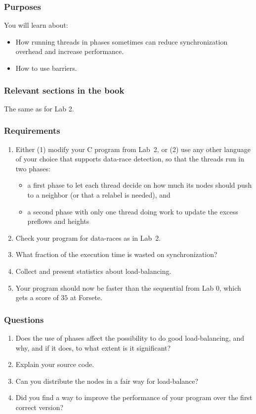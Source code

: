 \documentclass{forsete}
\begin{document}
\subsubsection*{Purposes}
You will learn about:
\begin{itemize}
\item How running threads in phases sometimes can reduce synchronization overhead and increase performance.
\item How to use barriers.
\end{itemize}

\subsubsection*{Relevant sections in the book}
The same as for Lab 2.
\subsubsection*{Requirements}
\begin{enumerate}
\item Either (1) modify your C program from Lab~2, or (2) use any other language of your choice that
supports data-race detection, so that the threads run in two phases:
\begin{itemize}
\item a first phase to let each thread decide on how much its nodes should push to a neighbor (or that a relabel is needed), and
\item a second phase with only one thread doing work to update the excess preflows and heights
\end{itemize}
\item Check your program for data-races as in Lab~2.

\item What fraction of the execution time is wasted on synchronization?

\item Collect and present statistics about load-balancing.
\item Your program should now be faster than the sequential from Lab 0, which gets a score of $35$ at
Forsete.

\end{enumerate}

\subsubsection*{Questions}
\begin{enumerate}
\item Does the use of phases affect the possibility to do good load-balancing, and why, and if it does, to 
what extent is it significant?
\item Explain your source code.
\item Can you distribute the nodes in a fair way for load-balance?
\item Did you find a way to improve the performance of your program over the first correct version?

\end{enumerate}
\end{document}
